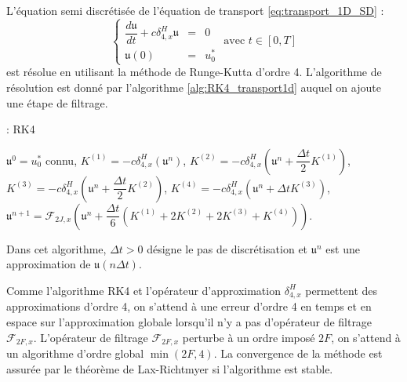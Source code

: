 L'équation semi discrétisée de l'équation de transport \eqref{eq:transport_1D_SD} :
\begin{equation}
\left\lbrace
\begin{array}{rcl}
\dfrac{d \mathfrak{u}}{dt} + c \delta_{4,x}^H \mathfrak{u}& = &0 \\
\mathfrak{u}(0) & = & u_0^*
\end{array}
\text{ avec } t \in [0,T]
\right.
\label{eq:transport_1D_SD}
\end{equation}
est résolue en utilisant la méthode de Runge-Kutta d'ordre 4. L'algorithme de résolution est donné par l'algorithme \ref{alg:RK4_transport1d} auquel on ajoute une étape de filtrage.
\begin{center}
\begin{minipage}[H]{12cm}
  \begin{algorithm}[H]
    \caption{: RK4}\label{alg:RK4_transport1d}
    \begin{algorithmic}[1]
    \State $\mathfrak{u}^0 = u_0^*$ connu,
             \State  $K^{(1)} = - c \delta_{4,x}^H \left( \mathfrak{u}^n \right)$,
             \State  $K^{(2)} = - c \delta_{4,x}^H \left( \mathfrak{u}^n + \dfrac{\Delta t}{2} K^{(1)}\right)$,
             \State  $K^{(3)} = - c \delta_{4,x}^H \left( \mathfrak{u}^n + \dfrac{\Delta t}{2} K^{(2)}\right)$,
             \State  $K^{(4)} = - c \delta_{4,x}^H \left( \mathfrak{u}^n + \Delta t K^{(3)}\right)$,  
             \State  $\mathfrak{u}^{n+1} = \mathcal{F}_{2J,x}\left( \mathfrak{u}^n  + \dfrac{\Delta t}{6} \left( K^{(1)} + 2 K^{(2)} + 2 K^{(3)} + K^{(4)} \right) \right)$.
            \EndFor
    \end{algorithmic}
    \end{algorithm}
\end{minipage}
\end{center}
Dans cet algorithme, $\Delta t > 0$ désigne le pas de discrétisation et $\mathfrak{u}^n$ est une approximation de $\mathfrak{u}(n \Delta t)$.

Comme l'algorithme RK4 et l'opérateur d'approximation $\delta_{4,x}^H$ permettent des approximations d'ordre 4, on s'attend à une erreur d'ordre 4 en temps et en espace sur l'approximation globale lorsqu'il n'y a pas d'opérateur de filtrage $\mathcal{F}_{2F,x}$. L'opérateur de filtrage $\mathcal{F}_{2F,x}$ perturbe à un ordre imposé $2F$, on s'attend à un algorithme d'ordre global $\min(2F,4)$.
La convergence de la méthode est assurée par le théorème de Lax-Richtmyer \cite{Lax1956} si l'algorithme est stable.




